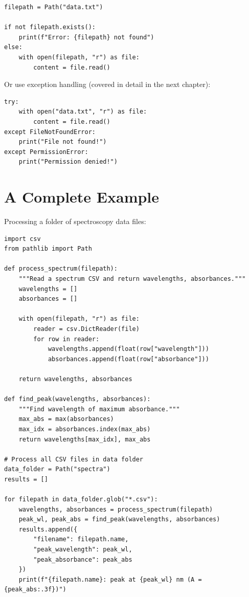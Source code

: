 \begin{labexample}
\begin{lstlisting}
filepath = Path("data.txt")

if not filepath.exists():
    print(f"Error: {filepath} not found")
else:
    with open(filepath, "r") as file:
        content = file.read()
\end{lstlisting}

Or use exception handling (covered in detail in the next chapter):

\begin{lstlisting}
try:
    with open("data.txt", "r") as file:
        content = file.read()
except FileNotFoundError:
    print("File not found!")
except PermissionError:
    print("Permission denied!")
\end{lstlisting}

\section{A Complete Example}
\label{sec:files-example}

Processing a folder of spectroscopy data files:

\begin{lstlisting}
import csv
from pathlib import Path

def process_spectrum(filepath):
    """Read a spectrum CSV and return wavelengths, absorbances."""
    wavelengths = []
    absorbances = []

    with open(filepath, "r") as file:
        reader = csv.DictReader(file)
        for row in reader:
            wavelengths.append(float(row["wavelength"]))
            absorbances.append(float(row["absorbance"]))

    return wavelengths, absorbances

def find_peak(wavelengths, absorbances):
    """Find wavelength of maximum absorbance."""
    max_abs = max(absorbances)
    max_idx = absorbances.index(max_abs)
    return wavelengths[max_idx], max_abs

# Process all CSV files in data folder
data_folder = Path("spectra")
results = []

for filepath in data_folder.glob("*.csv"):
    wavelengths, absorbances = process_spectrum(filepath)
    peak_wl, peak_abs = find_peak(wavelengths, absorbances)
    results.append({
        "filename": filepath.name,
        "peak_wavelength": peak_wl,
        "peak_absorbance": peak_abs
    })
    print(f"{filepath.name}: peak at {peak_wl} nm (A = {peak_abs:.3f})")


\end{lstlisting}
\end{labexample}
